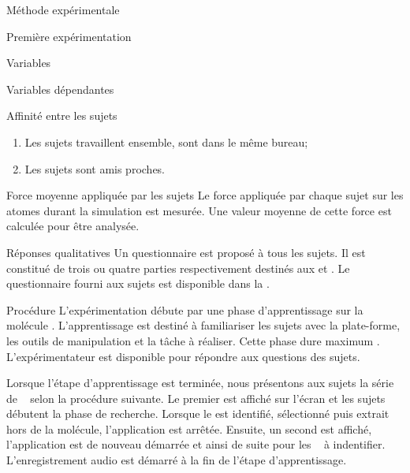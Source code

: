 \documentclass[myfrancais]{mythesis}
\begin{document}
\begin{mychapter}{Méthode expérimentale}
\begin{mysection}{Première expérimentation}
\begin{mysubsection}{Variables}
\begin{mysubsubsection}{Variables dépendantes}
\begin{myparagraph}{ Affinité entre les sujets}
\begin{enumerate}
							\item Les sujets travaillent ensemble, sont dans le même bureau;
							\item Les sujets sont amis proches.
						\end{enumerate}
					\end{myparagraph}
					\begin{myparagraph}{ Force moyenne appliquée par les sujets}
						Le force appliquée par chaque sujet sur les atomes durant la simulation est mesurée.
						Une valeur moyenne de cette force est calculée pour être analysée.
					\end{myparagraph}
					\begin{myparagraph}{ Réponses qualitatives}
						Un questionnaire est proposé à tous les sujets.
						Il est constitué de trois ou quatre parties respectivement destinés aux  et .
						Le questionnaire fourni aux sujets est disponible dans la .
					\end{myparagraph}
				\end{mysubsubsection}
			\end{mysubsection}
			\begin{mysubsection}{Procédure}
				L'expérimentation débute par une phase d'apprentissage sur la molécule \myTRPZIPPER.
				L'apprentissage est destiné à familiariser les sujets avec la plate-forme, les outils de manipulation et la tâche à réaliser.
				Cette phase dure maximum .
				L'expérimentateur est disponible pour répondre aux questions des sujets.

				Lorsque l'étape d'apprentissage est terminée, nous présentons aux sujets la série de ~ selon la procédure suivante.
				Le premier  est affiché sur l'écran \myLCD et les sujets débutent la phase de recherche.
				Lorsque le  est identifié, sélectionné puis extrait hors de la molécule, l'application est arrêtée.
				Ensuite, un second  est affiché, l'application est de nouveau démarrée et ainsi de suite pour les ~ à indentifier.
				L'enregistrement audio est démarré à la fin de l'étape d'apprentissage.


\end{mysubsection}
\end{mysection}
\end{mychapter}
\end{document}
